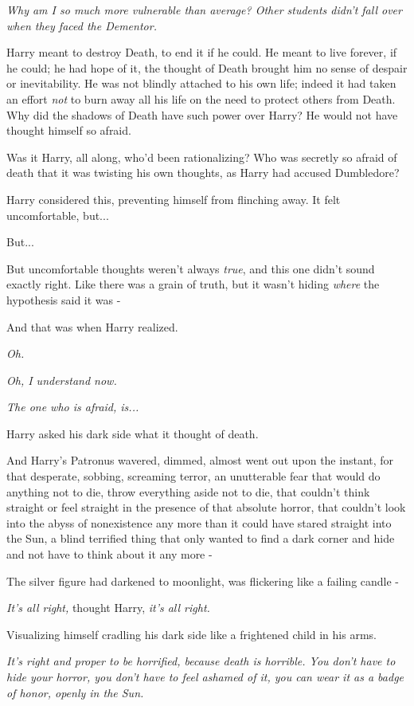 \emph{Why am I so much more vulnerable than average? Other students didn't fall over when they faced the Dementor.}

Harry meant to destroy Death, to end it if he could. He meant to live forever, if he could; he had hope of it, the thought of Death brought him no sense of despair or inevitability. He was not blindly attached to his own life; indeed it had taken an effort \emph{not} to burn away all his life on the need to protect others from Death. Why did the shadows of Death have such power over Harry? He would not have thought himself so afraid.

Was it Harry, all along, who'd been rationalizing? Who was secretly so afraid of death that it was twisting his own thoughts, as Harry had accused Dumbledore?

Harry considered this, preventing himself from flinching away. It felt uncomfortable, but...

But...

But uncomfortable thoughts weren't always \emph{true}, and this one didn't sound exactly right. Like there was a grain of truth, but it wasn't hiding \emph{where} the hypothesis said it was -

And that was when Harry realized.

\emph{Oh.}

\emph{Oh, I understand now.}

\emph{The one who is afraid, is...}

Harry asked his dark side what it thought of death.

And Harry's Patronus wavered, dimmed, almost went out upon the instant, for that desperate, sobbing, screaming terror, an unutterable fear that would do anything not to die, throw everything aside not to die, that couldn't think straight or feel straight in the presence of that absolute horror, that couldn't look into the abyss of nonexistence any more than it could have stared straight into the Sun, a blind terrified thing that only wanted to find a dark corner and hide and not have to think about it any more -

The silver figure had darkened to moonlight, was flickering like a failing candle -

\emph{It's all right,} thought Harry, \emph{it's all right.}

Visualizing himself cradling his dark side like a frightened child in his arms.

\emph{It's right and proper to be horrified, because death is horrible. You don't have to hide your horror, you don't have to feel ashamed of it, you can wear it as a badge of honor, openly in the Sun.}

